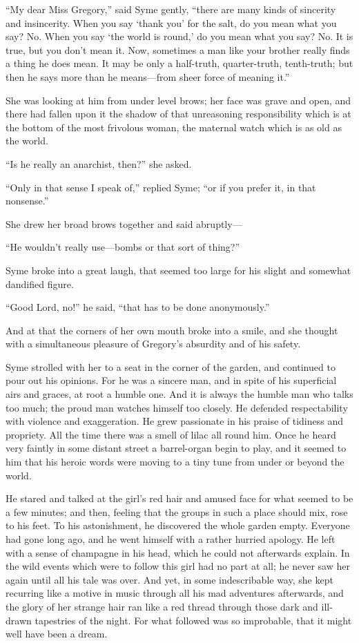 \documentclass{book}
\begin{document}
“My dear Miss Gregory,” said Syme gently, “there are many kinds of sincerity and insincerity. When you say ‘thank you’ for the salt, do you mean what you say? No. When you say ‘the world is round,’ do you mean what you say? No. It is true, but you don’t mean it. Now, sometimes a man like your brother really finds a thing he does mean. It may be only a half-truth, quarter-truth, tenth-truth; but then he says more than he means—from sheer force of meaning it.”

She was looking at him from under level brows; her face was grave and open, and there had fallen upon it the shadow of that unreasoning responsibility which is at the bottom of the most frivolous woman, the maternal watch which is as old as the world.

“Is he really an anarchist, then?” she asked.

“Only in that sense I speak of,” replied Syme; “or if you prefer it, in that nonsense.”

She drew her broad brows together and said abruptly—

“He wouldn’t really use—bombs or that sort of thing?”

Syme broke into a great laugh, that seemed too large for his slight and somewhat dandified figure.

“Good Lord, no!” he said, “that has to be done anonymously.”

And at that the corners of her own mouth broke into a smile, and she thought with a simultaneous pleasure of Gregory’s absurdity and of his safety.

Syme strolled with her to a seat in the corner of the garden, and continued to pour out his opinions. For he was a sincere man, and in spite of his superficial airs and graces, at root a humble one. And it is always the humble man who talks too much; the proud man watches himself too closely. He defended respectability with violence and exaggeration. He grew passionate in his praise of tidiness and propriety. All the time there was a smell of lilac all round him. Once he heard very faintly in some distant street a barrel-organ begin to play, and it seemed to him that his heroic words were moving to a tiny tune from under or beyond the world.

He stared and talked at the girl’s red hair and amused face for what seemed to be a few minutes; and then, feeling that the groups in such a place should mix, rose to his feet. To his astonishment, he discovered the whole garden empty. Everyone had gone long ago, and he went himself with a rather hurried apology. He left with a sense of champagne in his head, which he could not afterwards explain. In the wild events which were to follow this girl had no part at all; he never saw her again until all his tale was over. And yet, in some indescribable way, she kept recurring like a motive in music through all his mad adventures afterwards, and the glory of her strange hair ran like a red thread through those dark and ill-drawn tapestries of the night. For what followed was so improbable, that it might well have been a dream.
\end{document}
